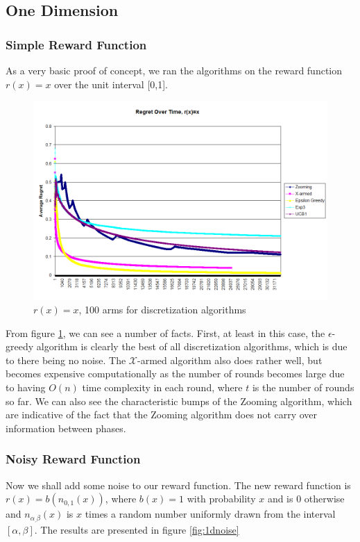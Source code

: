 \subsection{One Dimension}
\subsubsection{Simple Reward Function}
As a very basic proof of concept, we ran the algorithms on the reward
function $r(x) = x$ over the unit interval [0,1].

\begin{figure}[!ht]
  \begin{center}
    \includegraphics[width=\figwidth]{figures/1dsimpleplot.png}
     \caption{$r(x) = x$, 100 arms for discretization
     algorithms}
     \label{fig:1dsimple}
  \end{center}
\end{figure}

From figure \ref{fig:1dsimple}, we can see a number of facts.  First, at 
least in this case, the $\epsilon$-greedy algorithm is clearly the
best of all discretization algorithms, which is due to there being
no noise.  The $\mathcal{X}$-armed algorithm also does rather well,
but becomes expensive computationally as the number of rounds becomes
large due to having $O(n)$ time complexity in each round, where $t$ is
the number of rounds so far.  We can also see the characteristic bumps of
the Zooming algorithm, which are indicative of the fact that the Zooming
algorithm does not carry over information between phases.


\subsubsection{Noisy Reward Function}
Now we shall add some noise to our reward function.  The new reward
function is $r(x) = b(n_{0,1}(x))$, where $b(x) = 1$ with probability
$x$ and is 0 otherwise and $n_{\alpha_,\beta}(x)$ is $x$ times a random
number uniformly drawn from the interval $[\alpha, \beta]$.  The results
are presented in figure \ref{fig:1dnoise}

